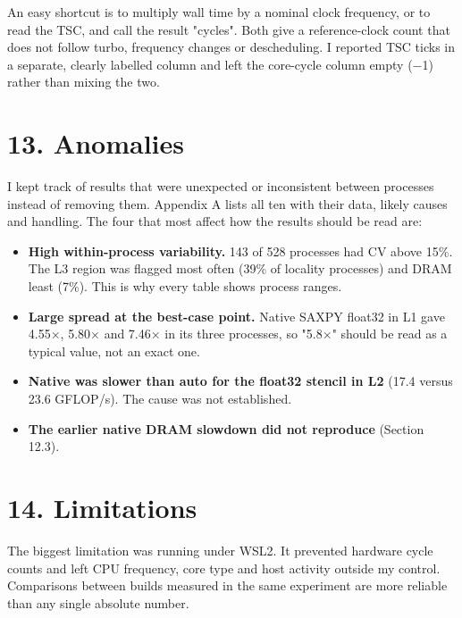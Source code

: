 \documentclass[10pt,letterpaper]{article}
\begin{document}
An easy shortcut is to multiply wall time by a nominal clock frequency, or to read the TSC, and call the result "cycles". Both give a reference-clock count that does not follow turbo, frequency changes or descheduling. I reported TSC ticks in a separate, clearly labelled column and left the core-cycle column empty ($-$1) rather than mixing the two.


\section*{13. Anomalies}

I kept track of results that were unexpected or inconsistent between processes instead of removing them. Appendix A lists all ten with their data, likely causes and handling. The four that most affect how the results should be read are:


\begin{itemize}\setlength{\itemsep}{2pt}

\item \textbf{High within-process variability.} 143 of 528 processes had CV above 15\%. The L3 region was flagged most often (39\% of locality processes) and DRAM least (7\%). This is why every table shows process ranges.

\item \textbf{Large spread at the best-case point.} Native SAXPY float32 in L1 gave 4.55$\times$, 5.80$\times$ and 7.46$\times$ in its three processes, so "5.8$\times$" should be read as a typical value, not an exact one.

\item \textbf{Native was slower than auto for the float32 stencil in L2} (17.4 versus 23.6 GFLOP/s). The cause was not established.

\item \textbf{The earlier native DRAM slowdown did not reproduce} (Section 12.3).

\end{itemize}

\section*{14. Limitations}

The biggest limitation was running under WSL2. It prevented hardware cycle counts and left CPU frequency, core type and host activity outside my control. Comparisons between builds measured in the same experiment are more reliable than any single absolute number.
\end{document}
